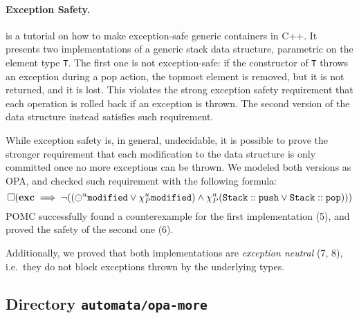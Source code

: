 \documentclass[9pt,a4paper]{article}
\begin{document}
\paragraph{Exception Safety.}
\cite{Sutter97} is a tutorial on how to make exception-safe generic
containers in C++. It presents two implementations of a generic stack
data structure, parametric on the element type \texttt{T}. The first
one is not exception-safe: if the constructor of \texttt{T} throws an
exception during a pop action, the topmost element is removed, but it
is not returned, and it is lost.  This violates the strong exception
safety \cite{Abrahams00} requirement that each operation is rolled
back if an exception is thrown. The second version of the data
structure instead satisfies such requirement.

While exception safety is, in general, undecidable, it is possible to
prove the stronger requirement that each modification to the data
structure is only committed once no more exceptions can be thrown.
We modeled both versions as OPA, and checked
such requirement with the following formula:
\[
\square (\mathbf{exc} \implies
         \neg ((\circleddash^u \mathtt{modified} \lor
               \chi_P^{u} \mathtt{modified})
         \land \chi_P^{u} (\mathtt{Stack::push} \lor \mathtt{Stack::pop})))
\]
POMC successfully found a counterexample for the first implementation (5),
and proved the safety of the second one (6).

Additionally, we proved that both implementations are
\emph{exception neutral} (7, 8), i.e.\ they do not block exceptions
thrown by the underlying types.


\subsection{Directory \texttt{automata/opa-more}}
\end{document}
